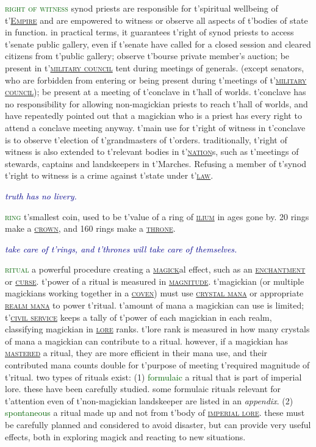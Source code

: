 \documentclass[twoside,11pt,b5paper,twocolumn]{scrbook}
\newcommand{\estcab}[1]{\textsc{\textcolor{marron}{#1}}}
\newcommand{\keyword}[1]{\textcolor{darkgreen}{#1}}
\renewcommand{\paragraph}[1]{\par\noindent\markboth{#1}{#1}\estcab{\keyword{#1}}\label{#1} }
\newcommand{\see}[1]{{\estcab{\hyperref[#1]{#1}}}}
\newcommand{\proverb}[1]{\par \textcolor{darkblue}{\itshape #1}}
\begin{document}
\paragraph{right of witness} synod priests are responsible for t'spiritual wellbeing of t'\see{Empire} and are empowered to witness or observe all aspects of t'bodies of state in function. in practical terms, it guarantees t'right of synod priests to access t'senate public gallery, even if t'senate have called for a closed session and cleared citizens from t'public gallery; observe t'bourse private member's auction; be present in t'\see{military council} tent during meetings of generals. (except senators, who are forbidden from entering or being present during t'meetings of t'\see{military council}); be present at a meeting of t'conclave in t'hall of worlds. t'conclave has no responsibility for allowing non-magickian priests to reach t'hall of worlds, and have repeatedly pointed out that a magickian who is a priest has every right to attend a conclave meeting anyway. t'main use for t'right of witness in t'conclave is to observe t'election of t'grandmasters of t'orders. traditionally, t'right of witness is also extended to t'relevant bodies in t'\see{nation}s, such as t'meetings of stewards, captains and landskeepers in t'Marches. Refusing a member of t'synod t'right to witness is a crime against t'state under t'\see{law}. \proverb{truth has no livery.}
\paragraph{ring} t'smallest coin, used to be t'value of a ring of \see{ilium} in ages gone by. 20 rings make a \see{crown}, and 160 rings make a \see{throne}. \proverb{take care of t'rings, and t'thrones will take care of themselves.}
\paragraph{ritual} a powerful procedure creating a \see{magick}al effect, such as an \see{enchantment} or \see{curse}. t'power of a ritual is measured in \see{magnitude}. t'magickian (or multiple magickians working together in a \see{coven}) must use \see{crystal mana} or appropriate \see{realm mana} to power t'ritual. t'amount of mana a magickian can use is limited; t'\see{civil service} keeps a tally of t'power of each magickian in each realm, classifying magickian in \see{lore} ranks. t'lore rank is measured in how many crystals of mana a magickian can contribute to a ritual. however, if a magickian has \see{mastered} a ritual, they are more efficient in their mana use, and their contributed mana counts double for t'purpose of meeting t'required magnitude of t'ritual. two types of rituals exist: (1) \keyword{formulaic} a ritual that is part of imperial lore. these have been carefully studied. some formulaic rituals relevant for t'attention even of t'non-magickian landskeeper are listed in an \emph{appendix}. (2) \keyword{spontaneous} a ritual made up and not from t'body of \see{imperial lore}. these must be carefully planned and considered to avoid disaster, but can provide very useful effects, both in exploring magick and reacting to new situations.
\end{document}
